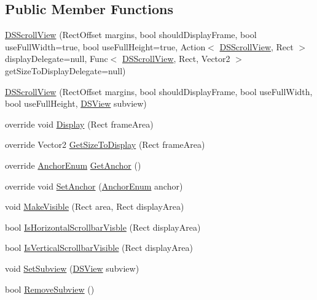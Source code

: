 \subsection*{Public Member Functions}
\begin{DoxyCompactItemize}
\item 
\hyperlink{class_d_s_scroll_view_a77453524354c687b5c7721bf83c3c626}{D\+S\+Scroll\+View} (Rect\+Offset margins, bool should\+Display\+Frame, bool use\+Full\+Width=true, bool use\+Full\+Height=true, Action$<$ \hyperlink{class_d_s_scroll_view}{D\+S\+Scroll\+View}, Rect $>$ display\+Delegate=null, Func$<$ \hyperlink{class_d_s_scroll_view}{D\+S\+Scroll\+View}, Rect, Vector2 $>$ get\+Size\+To\+Display\+Delegate=null)
\item 
\hyperlink{class_d_s_scroll_view_a349bb0c4d77d5ff0f68c5ded91d068eb}{D\+S\+Scroll\+View} (Rect\+Offset margins, bool should\+Display\+Frame, bool use\+Full\+Width, bool use\+Full\+Height, \hyperlink{class_d_s_view}{D\+S\+View} subview)
\item 
override void \hyperlink{class_d_s_scroll_view_ae83ca094db6d76251049b64572fc0d92}{Display} (Rect frame\+Area)
\item 
override Vector2 \hyperlink{class_d_s_scroll_view_a0a832bc24a9037e5a265ca878637ed67}{Get\+Size\+To\+Display} (Rect frame\+Area)
\item 
override \hyperlink{class_d_s_view_a8b41b9ec1b18bd33872a37cbd3a2dbe1}{Anchor\+Enum} \hyperlink{class_d_s_scroll_view_aecc8f1894c7e33e0eb87eca84c6f1ddf}{Get\+Anchor} ()
\item 
override void \hyperlink{class_d_s_scroll_view_abc9552fe959cbe544fd9e6d8b729dc29}{Set\+Anchor} (\hyperlink{class_d_s_view_a8b41b9ec1b18bd33872a37cbd3a2dbe1}{Anchor\+Enum} anchor)
\item 
void \hyperlink{class_d_s_scroll_view_a409e5f6add0e9dd27fead4cc6e641f3c}{Make\+Visible} (Rect area, Rect display\+Area)
\item 
bool \hyperlink{class_d_s_scroll_view_ab8bbe00cce2d59f2390a4464de23acad}{Is\+Horizontal\+Scrollbar\+Visble} (Rect display\+Area)
\item 
bool \hyperlink{class_d_s_scroll_view_ac6e361f0bb9725ba5a3954966fe839df}{Is\+Vertical\+Scrollbar\+Visible} (Rect display\+Area)
\item 
void \hyperlink{class_d_s_scroll_view_a959769b37b3850798d54b1f338da8939}{Set\+Subview} (\hyperlink{class_d_s_view}{D\+S\+View} subview)
\item 
bool \hyperlink{class_d_s_scroll_view_aca9d039232d296c13a89d529e2fa3d8c}{Remove\+Subview} ()
\end{DoxyCompactItemize}
